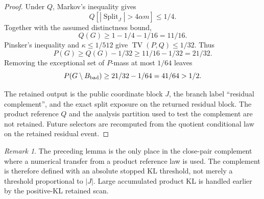 \documentclass[11pt]{article}
\theoremstyle{remark}
\newtheorem{remark}[theorem]{Remark}
\newcommand{\Split}{\operatorname{Split}}
\newcommand{\TV}{\operatorname{TV}}
\begin{document}
\begin{proof}
Under $Q$, Markov's inequality gives
\[
        Q[|\Split_J|>4\alpha m]\le 1/4.
\]
Together with the assumed distinctness bound,
\[
        Q(G)\ge 1-1/4-1/16=11/16.
\]
Pinsker's inequality and $\kappa\le 1/512$ give $\TV(P,Q)\le 1/32$.  Thus
\[
        P(G)\ge Q(G)-1/32\ge 11/16-1/32=21/32.
\]
Removing the exceptional set of $P$-mass at most $1/64$ leaves
\[
        P(G\setminus B_{\rm bad})\ge 21/32-1/64=41/64>1/2.
\]

The retained output is the public coordinate block $J$, the branch label ``residual complement'', and the exact split exposure on the returned residual block.  The product reference $Q$ and the analysis partition used to test the complement are not retained.  Future selectors are recomputed from the quotient conditional law on the retained residual event.
\end{proof}

\begin{remark}
The preceding lemma is the only place in the close-pair complement where a numerical transfer from a product reference law is used.  The complement is therefore defined with an absolute stopped KL threshold, not merely a threshold proportional to $|J|$.  Large accumulated product KL is handled earlier by the positive-KL retained scan.
\end{remark}
\end{document}
